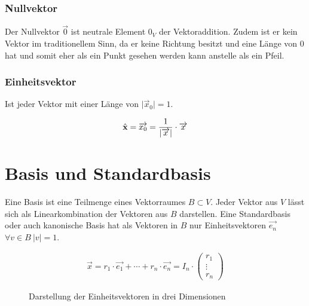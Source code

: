 \subsubsection{ Nullvektor }

Der Nullvektor $ \overrightarrow{0} $ ist neutrale Element $ 0_V $  der Vektoraddition. Zudem ist er kein Vektor im traditionellem Sinn, da er keine Richtung besitzt und eine Länge von $0$ hat und somit eher als ein Punkt gesehen werden kann anstelle als ein Pfeil.


\subsubsection{ Einheitsvektor }

Ist jeder Vektor mit einer Länge von $\vert \overrightarrow{x}_0 \vert = 1 $.

\begin{align*}
\hat{\textbf{x}} = \overrightarrow{x_0} = \frac{1}{\vert \overrightarrow{x} \vert} \cdot \overrightarrow{x} 
\end{align*}

\section{Basis und Standardbasis}

Eine Basis ist eine Teilmenge eines Vektorraumes $ B \subset V $. Jeder Vektor aus $ V $ lässt sich als Linearkombination der Vektoren aus $ B $ darstellen. Eine Standardbasis oder auch kanonische Basis hat als Vektoren in $ B $ nur Einheitsvektoren $ \overrightarrow{e_n}$  $ \forall v \in B \ \vert v \vert = 1 $.

\begin{align*}
	\overrightarrow{x} = r_1 \cdot \overrightarrow{e_1}  + \cdots + r_n \cdot \overrightarrow{e_n} = 
	I_n \cdot 		
	\begin{pmatrix}
		r_1 \\ \vdots \\ r_n
	\end{pmatrix}
\end{align*}

\begin{figure}[h]
\centering
{}
\caption{Darstellung der Einheitsvektoren in drei Dimensionen}
\end{figure}

